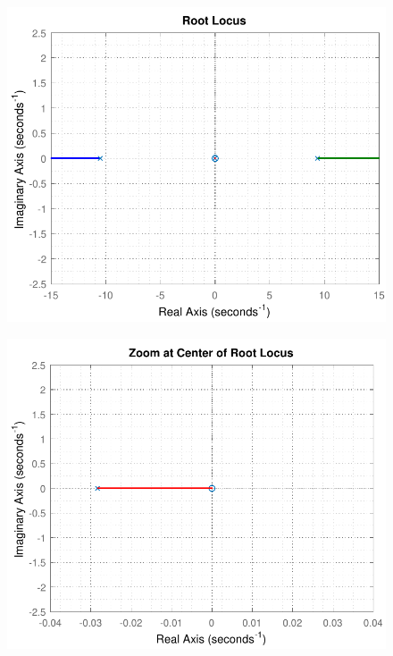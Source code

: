 \begin{minipage}{\linewidth}
 	\begin{minipage}{0.45\linewidth}
 		\begin{figure}[H]
 			\includegraphics[scale=.56]{figures/rlocusCubli}
 			\centering
 			\captionsetup{justification=centering}
 			\label{rlocusCubli}
 		\end{figure}
 	\end{minipage}
 	\hspace{0.03\linewidth}
 	\begin{minipage}{0.45\linewidth}
 		\begin{figure}[H]\vspace{4mm}
 			\includegraphics[scale=.56]{figures/rlocusCubliZoom}
 			\centering
 			\captionsetup{justification=centering}
 			\label{rlocusCubliZoom}
 		\end{figure}
 	\end{minipage}
\end{minipage}

